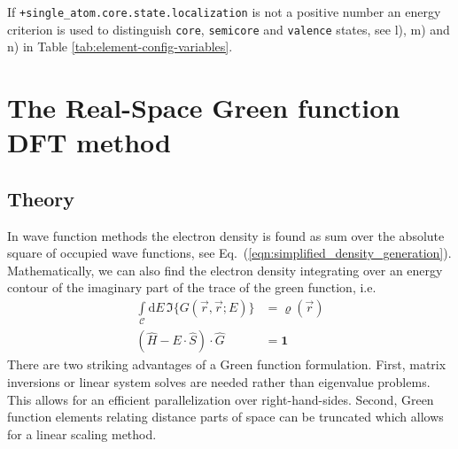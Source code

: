 \documentclass[oribibl]{llncs}
\newcommand{\ttt}[1]{\texttt{#1}}
\begin{document}
\noindent
If \ttt{+single\_atom.core.state.localization} is not a positive number
an energy criterion is used to distinguish \ttt{core}, \ttt{semicore} and \ttt{valence} states, see l), m) and n) in Table \ref{tab:element-config-variables}.









\cleardoublepage
\newpage

\section{The Real-Space Green function DFT method} \label{sec:green}

\subsection{Theory}
In wave function methods the electron density is found as sum over the absolute square of occupied wave functions, see Eq.~(\ref{eqn:simplified_density_generation}).
Mathematically, we can also find the electron density integrating over an energy contour of the imaginary part of the trace of the green function, i.e.
\begin{align}
  \int\limits_{\mathcal C} \mathrm{d}E \, \Im\{ G(\vec r, \vec r; E) \} &= \varrho(\vec r) \\
  \left( \hat H - E \cdot \hat S \right) \cdot \hat G &= \mathbf{1}
\end{align}
There are two striking advantages of a Green function formulation.
First, matrix inversions or linear system solves are needed rather than eigenvalue problems.
This allows for an efficient parallelization over right-hand-sides.
Second, Green function elements relating distance parts of space can be truncated which allows for a linear scaling method.
\end{document}
